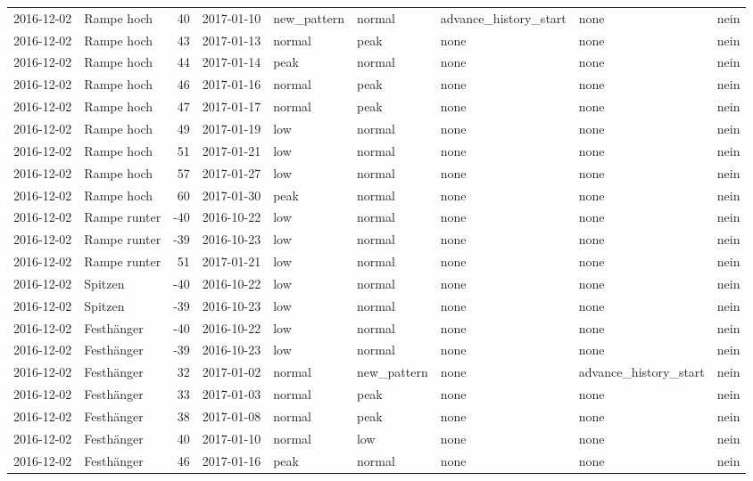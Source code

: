 \begin{tabular}{llrllllll}
2016-12-02 & Rampe hoch & 40 & 2017-01-10 & new\_pattern & normal & advance\_history\_start & none & nein \\
2016-12-02 & Rampe hoch & 43 & 2017-01-13 & normal & peak & none & none & nein \\
2016-12-02 & Rampe hoch & 44 & 2017-01-14 & peak & normal & none & none & nein \\
2016-12-02 & Rampe hoch & 46 & 2017-01-16 & normal & peak & none & none & nein \\
2016-12-02 & Rampe hoch & 47 & 2017-01-17 & normal & peak & none & none & nein \\
2016-12-02 & Rampe hoch & 49 & 2017-01-19 & low & normal & none & none & nein \\
2016-12-02 & Rampe hoch & 51 & 2017-01-21 & low & normal & none & none & nein \\
2016-12-02 & Rampe hoch & 57 & 2017-01-27 & low & normal & none & none & nein \\
2016-12-02 & Rampe hoch & 60 & 2017-01-30 & peak & normal & none & none & nein \\
2016-12-02 & Rampe runter & -40 & 2016-10-22 & low & normal & none & none & nein \\
2016-12-02 & Rampe runter & -39 & 2016-10-23 & low & normal & none & none & nein \\
2016-12-02 & Rampe runter & 51 & 2017-01-21 & low & normal & none & none & nein \\
2016-12-02 & Spitzen & -40 & 2016-10-22 & low & normal & none & none & nein \\
2016-12-02 & Spitzen & -39 & 2016-10-23 & low & normal & none & none & nein \\
2016-12-02 & Festhänger & -40 & 2016-10-22 & low & normal & none & none & nein \\
2016-12-02 & Festhänger & -39 & 2016-10-23 & low & normal & none & none & nein \\
2016-12-02 & Festhänger & 32 & 2017-01-02 & normal & new\_pattern & none & advance\_history\_start & nein \\
2016-12-02 & Festhänger & 33 & 2017-01-03 & normal & peak & none & none & nein \\
2016-12-02 & Festhänger & 38 & 2017-01-08 & normal & peak & none & none & nein \\
2016-12-02 & Festhänger & 40 & 2017-01-10 & normal & low & none & none & nein \\
2016-12-02 & Festhänger & 46 & 2017-01-16 & peak & normal & none & none & nein \\

\end{tabular}
